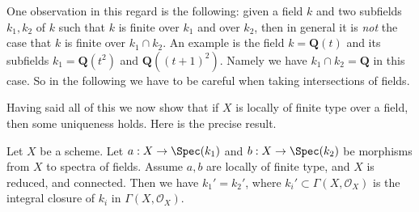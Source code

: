 \medskip\noindent
One observation in this regard is the following: given a field
$k$ and two subfields $k_1, k_2$ of $k$ such that $k$ is finite
over $k_1$ and over $k_2$, then in general it is {\it not} the case
that $k$ is finite over $k_1 \cap k_2$. An example is the field
$k = \mathbf{Q}(t)$ and its subfields $k_1 = \mathbf{Q}(t^2)$ and
$\mathbf{Q}((t + 1)^2)$. Namely we have $k_1 \cap k_2 = \mathbf{Q}$
in this case. So in the following we have to be careful when taking
intersections of fields.

\medskip\noindent
Having said all of this we now show that if $X$ is locally of finite
type over a field, then some uniqueness holds. Here is the precise
result.

\begin{proposition}
\label{proposition-unique-base-field}
Let $X$ be a scheme. Let $a : X \to \Spec(k_1)$ and
$b : X \to \Spec(k_2)$ be morphisms from $X$ to spectra of fields.
Assume $a, b$ are locally of finite type, and
$X$ is reduced, and connected. Then we have
$k_1' = k_2'$, where $k_i' \subset \Gamma(X, \mathcal{O}_X)$ is
the integral closure of $k_i$ in $\Gamma(X, \mathcal{O}_X)$.
\end{proposition}


